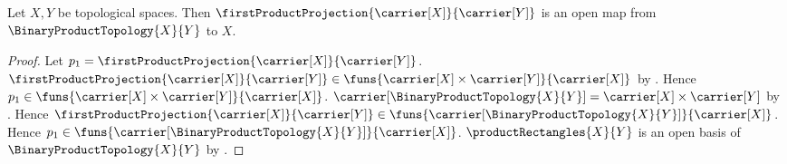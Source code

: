 \begin{theorem}\label{first_product_projection_is_open_map}
    Let $X,Y$ be topological spaces.
    Then $\firstProductProjection{\carrier[X]}{\carrier[Y]}$ is an open
        map from $\BinaryProductTopology{X}{Y}$ to $X$.
\end{theorem}
\begin{proof}
    Let $p_1=\firstProductProjection{\carrier[X]}{\carrier[Y]}$.
    $\firstProductProjection{\carrier[X]}{\carrier[Y]}\in
        \funs{\carrier[X]\times\carrier[Y]}{\carrier[X]}$ by
        .
    Hence $p_1\in\funs{
        \carrier[X]\times\carrier[Y]}{\carrier[X]}$.
    $\carrier[\BinaryProductTopology{X}{Y}]
        =\carrier[X]\times\carrier[Y]$ by
        .
    Hence $\firstProductProjection{\carrier[X]}{\carrier[Y]}\in
        \funs{\carrier[\BinaryProductTopology{X}{Y}]}{\carrier[X]}$.
    Hence $p_1\in\funs{
        \carrier[\BinaryProductTopology{X}{Y}]}{\carrier[X]}$.
    $\productRectangles{X}{Y}$ is an open basis of
        $\BinaryProductTopology{X}{Y}$ by
        .


\end{proof}

